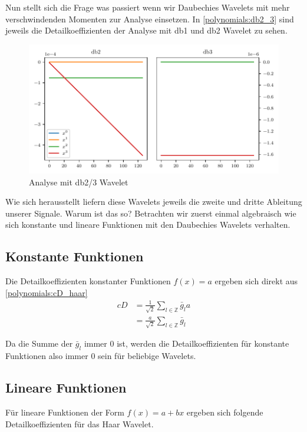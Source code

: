 \begin{refsection}
Nun stellt sich die Frage was passiert wenn wir Daubechies Wavelets mit mehr
verschwindenden Momenten zur Analyse einsetzen. In \autoref{polynomials:db2_3}
sind jeweils die Detailkoeffizienten der Analyse mit db1 und db2 Wavelet zu
sehen.

\begin{figure}
    \centering
    \includegraphics{papers/polynomials/images/polynomials_signals_db2_3.pdf}
    \caption{Analyse mit db2/3 Wavelet\label{polynomials:db2_3}}
\end{figure}

Wie sich herausstellt liefern diese Wavelets jeweils die zweite und dritte
Ableitung unserer Signale. Warum ist das so?
Betrachten wir zuerst einmal algebraisch wie sich konstante und lineare
Funktionen mit den Daubechies Wavelets verhalten.

\subsection{Konstante Funktionen}
Die Detailkoeffizienten konstanter Funktionen $f(x) = a$ ergeben sich direkt
aus \autoref{polynomials:cD_haar}
\begin{align*}
    cD &= \frac{1}{\sqrt{2}} \sum_{l\in\mathbb Z} \bar{g}_l a \\
       &= \frac{a}{\sqrt{2}} \sum_{l\in\mathbb Z} \bar{g}_l
\end{align*}

Da die Summe der $\bar{g}_l$ immer 0 ist, werden die Detailkoeffizienten für
konstante Funktionen also immer 0 sein für beliebige Wavelets.

\subsection{Lineare Funktionen}

Für lineare Funktionen der Form $f(x) = a + b x$ ergeben sich folgende Detailkoeffizienten für das Haar Wavelet.


\end{refsection}
